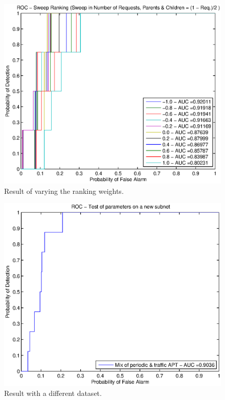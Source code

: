 \documentclass[conference]{IEEEtran}
\begin{document}
\begin{figure}
  \centering
  \includegraphics[width=0.9\linewidth]{ranking_sweep.eps}
  \caption{Result of varying the ranking weights.}
  \label{fig:test:ranking}
\end{figure}

\begin{figure}
  \centering
  \includegraphics[width=0.9\linewidth]{cross_validation.eps}
  \caption{Result with a different dataset.}
  \label{fig:test:cross}
\end{figure}
\end{document}
